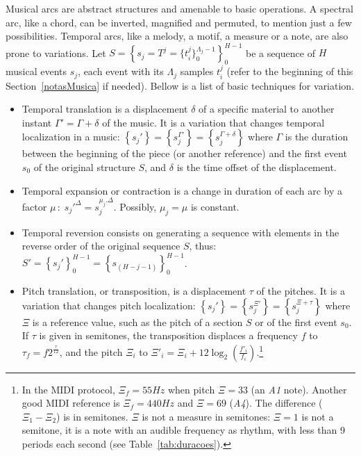 Musical arcs are abstract structures and amenable to basic operations. A spectral arc, like a chord, can be inverted, magnified and permuted, to mention just a few possibilities. Temporal arcs, like a melody, a motif, a measure or a note, are also
prone to variations. Let
$S=\left\{s_j=T^j=\{t_i^{j}\}_0^{\Lambda_j-1}\right\}_0^{H-1}$ be a sequence
of $H$ musical events $s_j$, each event with its $\Lambda_j$ samples $t_i^j$
(refer to the beginning of this Section~\ref{notasMusica} if needed). Bellow is a list of basic techniques
for variation.
\begin{itemize}
        \item Temporal translation is a displacement
    $\delta$ of a specific material to another instant $\Gamma'=\Gamma + \delta$
    of the music. It is a variation that changes temporal localization in
    a music:
    $\left\{s_j'\right\}=\left\{s_j^{\Gamma'}\right\}=\left\{s_j^{\Gamma+\delta}\right\}$
    where $\Gamma$ is the duration between the beginning of the piece (or another reference)
        and the first event $s_0$ of the original structure $S$, and
    $\delta$ is the time offset of the displacement.

    \item Temporal expansion or contraction is a change in duration of each
    arc by a factor $\mu\,:\; s_j'^{\Delta}=s_j^{\mu_j . \Delta}$. Possibly,
    $\mu_j=\mu$ is constant.

    \item Temporal reversion consists on generating a sequence with elements
    in the reverse order of the original sequence $S$, thus: $S'=\left\{s_j'\right\}_0^{H-1}=\left\{s_{(H-j-1)}\right\}_0^{H-1}$.

    \item Pitch translation, or transposition, is a displacement $\tau$ of the pitches.
        It is a variation that changes pitch
        localization:
        $\left\{s_j'\right\}=\left\{s_j^{\Xi'}\right\}=\left\{s_j^{\Xi+\tau}\right\}$
        where $\Xi$ is a reference value, such as the pitch of a section $S$ or of the first event $s_0$.
        If $\tau$ is given in semitones, the transposition displaces a
        frequency $f$ to $\tau_f=f2^{\frac{\tau}{12}}$,
        and the pitch $\Xi_i$ to $\Xi'_i=\Xi_i +12
		\log_2\left(\frac{f'_i}{f_i}\right)$.\footnote{In the MIDI protocol, $\Xi_{f}=55Hz$ when pitch $\Xi=33$
	(an \textit{A1} note). Another good MIDI reference is $\Xi_{f}=440Hz$ and
		$\Xi=69$ (\textit{A4}). The difference ($\Xi_1 - \Xi_2$) is in semitones.
        $\Xi$ is not a measure in semitones: $\Xi=1$ is not a semitone, it is a note with an audible frequency as rhythm, with
		less than 9 periods each second (see Table~\ref{tab:duracoes}).}


\end{itemize}
